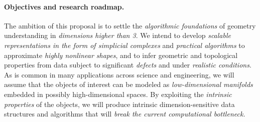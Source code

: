 \paragraph{Objectives and research roadmap.}
The ambition of this proposal is to settle the {\em algorithmic
foundations} of geometry understanding in {\em dimensions higher than
3}.  We intend to develop {\em scalable representations in the form of simplicial complexes} and {\em
practical algorithms} to approximate {\em highly nonlinear shapes}, and to
infer geometric and topological properties from data subject to
significant {\em defects} and under {\em realistic conditions}.
As is common in many applications across science and engineering, we
will assume that the objects of interest can be modeled as {\em
  low-dimensional manifolds} embedded in possibly high-dimensional
spaces. By exploiting the {\em intrinsic properties} of the objects,
we will produce intrinsic dimension-sensitive data structures and algorithms
that will {\em break the current computational
bottleneck.}  %

